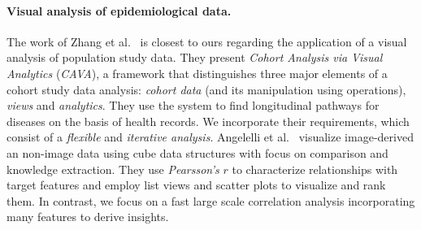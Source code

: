 \documentclass[journal]{style/vgtc} 			          %
\begin{document}
\paragraph{Visual analysis of epidemiological data.}
The work of Zhang et al.~\cite{Gotz2014, Zhang2014} is closest to ours regarding the application of a visual analysis of population study data.
They present \emph{Cohort Analysis via Visual Analytics} (\emph{CAVA}), a framework that distinguishes three major elements of a cohort study data analysis: \emph{cohort data} (and its manipulation using operations), \emph{views} and \emph{analytics}.
They use the system to find longitudinal pathways for diseases on the basis of health records.
We incorporate their requirements, which consist of a \emph{flexible} and \emph{iterative analysis}. %
Angelelli et al.~\cite{Angelelli} visualize image-derived an non-image data using cube data structures with focus on comparison and knowledge extraction.
They use \emph{Pearsson's} $r$ to characterize relationships with target features and employ list views and scatter plots to visualize and rank them.
In contrast, we focus on a fast large scale correlation analysis incorporating many features to derive insights.
\end{document}
